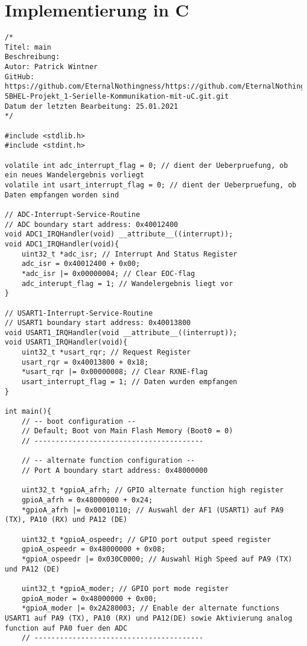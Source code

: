 \documentclass[11pt]{report}
\begin{document}
	\section{Implementierung in C}
		\begin{lstlisting}
/*
Titel: main
Beschreibung:
Autor: Patrick Wintner
GitHub: https://github.com/EternalNothingness/https://github.com/EternalNothingness/DIC-5BHEL-Projekt_1-Serielle-Kommunikation-mit-uC.git.git
Datum der letzten Bearbeitung: 25.01.2021
*/

#include <stdlib.h>
#include <stdint.h>

volatile int adc_interrupt_flag = 0; // dient der Ueberpruefung, ob ein neues Wandelergebnis vorliegt
volatile int usart_interrupt_flag = 0; // dient der Ueberpruefung, ob Daten empfangen worden sind

// ADC-Interrupt-Service-Routine
// ADC boundary start address: 0x40012400
void ADC1_IRQHandler(void) __attribute__((interrupt));
void ADC1_IRQHandler(void){
	uint32_t *adc_isr; // Interrupt And Status Register
	adc_isr = 0x40012400 + 0x00;
	*adc_isr |= 0x00000004; // Clear EOC-flag
	adc_interupt_flag = 1; // Wandelergebnis liegt vor
}

// USART1-Interrupt-Service-Routine
// USART1 boundary start address: 0x40013800
void USART1_IRQHandler(void __attribute__((interrupt));
void USART1_IRQHandler(void){
	uint32_t *usart_rqr; // Request Register
	usart_rqr = 0x40013800 + 0x18;
	*usart_rqr |= 0x00000008; // Clear RXNE-flag
	usart_interrupt_flag = 1; // Daten wurden empfangen
}

int main(){
	// -- boot configuration --
	// Default; Boot von Main Flash Memory (Boot0 = 0)
	// ----------------------------------------

	// -- alternate function configuration --
	// Port A boundary start address: 0x48000000

	uint32_t *gpioA_afrh; // GPIO alternate function high register
	gpioA_afrh = 0x48000000 + 0x24;
	*gpioA_afrh |= 0x00010110; // Auswahl der AF1 (USART1) auf PA9 (TX), PA10 (RX) und PA12 (DE)

	uint32_t *gpioA_ospeedr; // GPIO port output speed register
	gpioA_ospeedr = 0x48000000 + 0x08;
	*gpioA_ospeedr |= 0x030C0000; // Auswahl High Speed auf PA9 (TX) und PA12 (DE)

	uint32_t *gpioA_moder; // GPIO port mode register
	gpioA_moder = 0x48000000 + 0x00;
	*gpioA_moder |= 0x2A280003; // Enable der alternate functions USART1 auf PA9 (TX), PA10 (RX) und PA12(DE) sowie Aktivierung analog function auf PA0 fuer den ADC
	// ----------------------------------------


\end{lstlisting}
\end{document}
